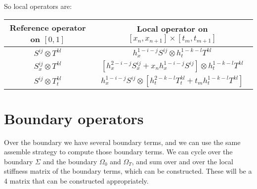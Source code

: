 \documentclass[]{report}
\begin{document}
    So local operators are:
    \begin{center}
        \begin{tabular}[]{|c|c|}
            \hline
            Reference operator on $[0,1]$ & Local operator on $[x_n,x_{n+1}] \times [t_m, t_{m+1}]$\\
            \hline \hline
            $S^{ij} \otimes T^{kl}$ & $h_x^{1 - i - j} S^{ij} \otimes h_t^{1 - k - l} T^{kl}$ \\
            \hline
            $S_x^{ij} \otimes T^{kl}$ & $\left[h_x^{2 - i - j} S_x^{ij} + x_{n} h_x^{1 - i - j} S^{ij}\right]  \otimes h_t^{1 - k - l} T^{kl}$ \\
            \hline
            $S^{ij} \otimes T_t^{kl}$ & $ h_x^{1 - i - j} S^{ij} \otimes \left[h_t^{2 - k - l} T_t^{kl} + t_{m} h_t^{1 - k - l} T^{kl}\right] $ \\
            \hline
        \end{tabular}
    \end{center}

    \section*{Boundary operators}
    Over the boundary we have several boundary terms, and we can use the same assemble strategy to compute those boundary terms. 
    We can cycle over the boundary $\Sigma$ and the boundary $\Omega_0$ and $\Omega_T$, and sum over and over the local stiffness matrix of the boundary terms, which can be constructed. These will be a 4 matrix that can be constructed appropriately.
\end{document}
